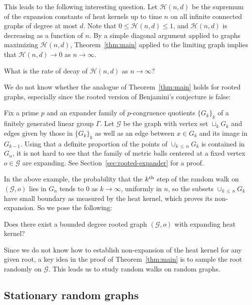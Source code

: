 \documentclass[AHL,Unicode,longabstracts,published]{cedram}
\newcommand{\calG}{\mathcal{G}}
\newcommand{\scH}{\mathscr{H}}
\begin{document}
This leads to the following interesting question. Let $\scH(n,d)$ be the supremum of the expansion constants of heat kernels up to time $n$ on all infinite connected graphs of degree at most $d$. Note that $0\leq \scH(n,d)\leq 1$, and $\scH(n,d)$ is decreasing as a function of $n$. By a simple diagonal argument applied to graphs maximizing $\scH(n,d)$, Theorem~\ref{thm:main} applied to the limiting graph implies that $\scH(n,d)\to 0$ as $n\to\infty$.

\begin{ques}
What is the rate of decay of $\scH(n,d)$ as $n\to\infty$?
\end{ques} 

We do not know whether the analogue of Theorem~\ref{thm:main} holds for rooted graphs, especially since the rooted version of Benjamini's conjecture is false:

\begin{exam}\label{ex:rooted_expansion}
Fix a prime $p$ and an expander family of $p$-congruence quotients $\{G_k\}_k$ of a finitely generated linear group $\Gamma$. Let $\calG$ be the graph with vertex set $\sqcup_k G_k$ and edges given by those in $\{G_k\}_k$ as well as an edge between $x\in G_k$ and its image in $G_{k-1}$. Using that a definite proportion of the points of $\cup_{k\,\leq\,n} G_k$ is contained in $G_n$, it is not hard to see that the family of metric balls centered at a fixed vertex $o\in\calG$ are expanding. See Section~\ref{sec:rooted-expander} for a proof.
\end{exam}

In the above example, the probability that the $k^{\rm th}$ step of the random walk on $(\calG, o)$ lies in $G_n$ tends to 0 as $k\to\infty$, uniformly in $n$, so the subsets $\cup_{k\,\leq\,n} G_k$ have small boundary as measured by the heat kernel, which proves its non-expansion. So we pose the following:

\begin{ques}
Does there exist a bounded degree rooted graph $(\calG, o)$ with expanding heat kernel?
\end{ques}

Since we do not know how to establish non-expansion of the heat kernel for any given root, a key idea in the proof of Theorem~\ref{thm:main} is to sample the root randomly on $\calG$. This leads us to study random walks on random graphs.

\subsection*{Stationary random graphs} \label{sec:stat_intro}
\end{document}
